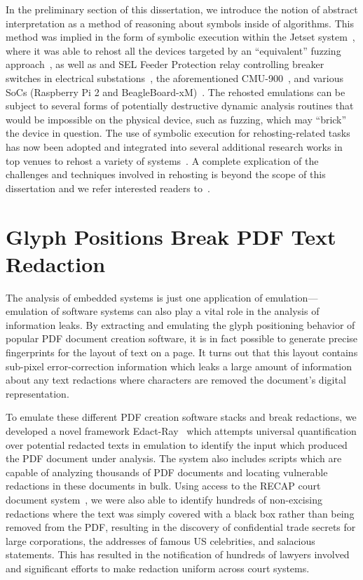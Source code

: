 In the preliminary section of this dissertation, we introduce the notion of abstract interpretation as a method of reasoning about symbols inside of algorithms.
This method was implied in the form of symbolic execution within the Jetset system~\cite{johnson2021jetset}, where it was able to rehost all the devices targeted by an ``equivalent'' fuzzing approach~\cite{p2im2020}, as well as and SEL Feeder Protection relay controlling breaker switches in electrical substations~\cite{feederprotection}, the aforementioned CMU-900~\cite{cmudevice}, and various SoCs (Raspberry Pi 2 and BeagleBoard-xM)~\cite{raspbpi, beagleboard}.
The rehosted emulations can be subject to several forms of potentially destructive dynamic analysis routines that would be impossible on the physical device, such as fuzzing, which may ``brick'' the device in question.
The use of symbolic execution for rehosting-related tasks has now been adopted and integrated into several additional research works in top venues to rehost a variety of systems~\cite{zhou2022your, chen2022metaemu, hernandez2022firmwire, sun2022spenny}.
A complete explication of the challenges and techniques involved in rehosting is beyond the scope of this dissertation and we refer interested readers to~\cite{wright2021challenges}.

\section{Glyph Positions Break PDF Text Redaction}

The analysis of embedded systems is just one application of emulation---emulation of software systems can also play a vital role in the analysis of information leaks.
By extracting and emulating the glyph positioning behavior of popular PDF document creation software, it is in fact possible to generate precise fingerprints for the layout of text on a page.
It turns out that this layout contains sub-pixel error-correction information which leaks a large amount of information about any text redactions where characters are removed the document's digital representation.

To emulate these different PDF creation software stacks and break redactions, we developed a novel framework Edact-Ray~\cite{bland2023story} which attempts universal quantification over potential redacted texts in emulation to identify the input which produced the PDF document under analysis.
The system also includes scripts which are capable of analyzing thousands of PDF documents and locating vulnerable redactions in these documents in bulk.
Using access to the RECAP court document system~\cite{recap}, we were also able to identify hundreds of non-excising redactions where the text was simply covered with a black box rather than being removed from the PDF, resulting in the discovery of confidential trade secrets for large corporations, the addresses of famous US celebrities, and salacious statements.
This has resulted in the notification of hundreds of lawyers involved and significant efforts to make redaction uniform across court systems.

